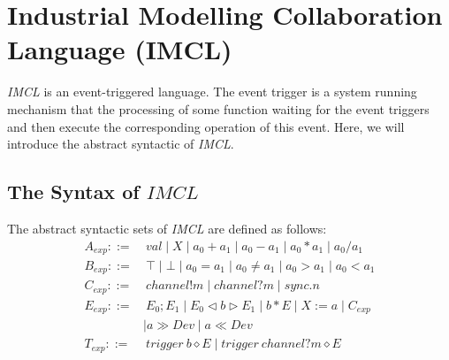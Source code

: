 \section{Industrial Modelling Collaboration Language (IMCL)}

\emph{IMCL} is an event-triggered language. The event trigger is a system running mechanism that the processing of some function waiting for the event triggers and then execute the corresponding operation of this event. Here, we will introduce the abstract syntactic of \emph{IMCL}.

\subsection{The Syntax of $IMCL$}

The abstract syntactic sets of \emph{IMCL} are defined as follows:
\begin{equation*}
    \begin{aligned}
        A_{exp} ::= &\ val \mid X \mid a_{0} + a_{1} \mid a_{0} - a_{1} \mid a_{0} * a_{1} \mid a_{0} / a_{1} \\
        B_{exp} ::= &\ \top \mid \bot \mid a_{0} = a_{1} \mid a_{0} \neq a_{1} \mid a_{0} > a_{1} \mid a_{0} < a_{1} \\
        C_{exp} ::= &\ channel!m \mid channel?m \mid sync.n \\
        E_{exp} ::= &\ E_{0};E_{1} \mid E_{0} \triangleleft b \triangleright E_{1} \mid b * E \mid X := a \mid C_{exp} \\
                    &\mid a \gg Dev \mid a \ll Dev \\
        T_{exp} ::= &\ trigger \ b \diamond E \mid trigger \ channel?m \diamond E  \\
    \end{aligned}
\end{equation*}

